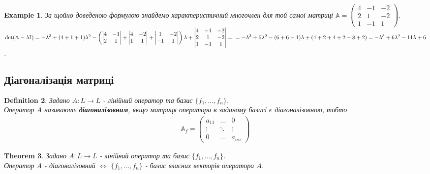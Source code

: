 \documentclass[a4paper, 10pt]{article}
\theoremstyle{theoremdd}
\newtheorem{theorem}{Theorem}[subsection]
\newtheorem{definition}[theorem]{Definition}
\newtheorem{example}[theorem]{Example}
\begin{document}
\begin{example}
За щойно доведеною формулою знайдемо характеристичний многочлен для той самої матриці $\mathbb{A} = \begin{pmatrix}
4 & -1 & -2 \\
2 & 1 & -2 \\
1 & -1 & 1
\end{pmatrix}$.\\
$\det (\mathbb{A} - \lambda \mathbb{I}) = -\lambda^3 + (4+1+1)\lambda^2 - \left( \begin{vmatrix}
4 & -1 \\
2 & 1
\end{vmatrix} + \begin{vmatrix}
4 & -2 \\
1 & 1
\end{vmatrix} + \begin{vmatrix}
1 & -2 \\
-1 & 1
\end{vmatrix} \right) \lambda + \begin{vmatrix}
4 & -1 & -2 \\
2 & 1 & -2 \\
1 & -1 & 1
\end{vmatrix} = \\
=-\lambda^3 + 6\lambda^2 - (6+6-1)\lambda + (4+2+4+2-8+2) = -\lambda^3 + 6\lambda^2 -11\lambda + 6$.
\end{example}

\subsection{Діагоналізація матриці}
\begin{definition}
Задано $A \colon L \to L$ - лінійний оператор та базис $\{f_1,\dots,f_n\}$.\\
Оператор $A$ називають \textbf{діагоналізовним}, якщо матриця оператора в заданому базисі є діагоналізовною, тобто
\begin{align*}
\mathbb{A}_f = \begin{pmatrix}
a_{11} & \dots & 0 \\
\vdots & \ddots & \vdots \\
0 & \dots & a_{nn}
\end{pmatrix}
\end{align*}
\end{definition}

\begin{theorem}
Задано $A \colon L \to L$ - лінійний оператор та базис $\{f_1,\dots,f_n\}$.\\
Оператор $A$ - діагоналізовний $\iff$ $\{f_1,\dots,f_n\}$ - базис власних векторів оператора $A$.
\end{theorem}
\end{document}
